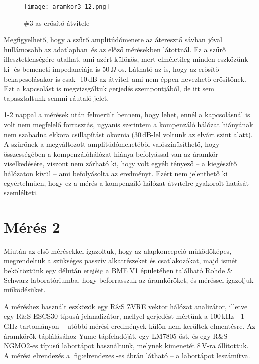 \begin{figure}[!ht]
	\centering
	\texttt{[image: aramkor3\_12.png]}
	\caption{\#3-as erősítő átvitele}
	\label{fig:erosito3}
\end{figure}

Megfigyelhető, hogy a szűrő amplitúdómenete az áteresztő sávban jóval hullámosabb az adatlapban\,\cite{SAW} és az előző mérésekben látottnál. Ez a szűrő illesztetlenségére utalhat, ami azért különös, mert elméletileg minden eszközünk ki- és bemeneti impedanciája is 50\,$\Omega$-os. Látható az is, hogy az erősítő bekapcsolásakor is csak -10\,dB az átvitel, ami nem éppen nevezhető erősítőnek. Ezt a kapcsolást is megvizsgáltuk gerjedés szempontjából, de itt sem tapasztaltunk semmi ráutaló jelet.

1-2 nappal a mérések után felmerült bennem, hogy lehet, ennél a kapcsolásnál is volt nem megfelelő forrasztás, ugyanis szerintem a kompenzáló hálózat hiányának nem szabadna ekkora csillapítást okoznia (30\,dB-lel voltunk az elvárt szint alatt). A szűrőnek a megváltozott amplitúdómenetéből valószínűsíthető, hogy összességében a kompenzálóhálózat hiánya befolyással van az áramkör viselkedésére, viszont nem zárható ki, hogy volt egyéb tényező -- a kiegészítő hálózaton kívül -- ami befolyásolta az eredményt. Ezért nem jelenthető ki egyértelműen, hogy ez a mérés a kompenzáló hálózat átvitelre gyakorolt hatását szemlélteti.


\section{Mérés 2}
\label{sec:meres2}

Miután az első mérésekkel igazoltuk, hogy az alapkoncepció működőképes, megrendeltük a szükséges passzív alkatrészeket és csatlakozókat\cite{90es_SMA}, majd ismét beköltöztünk egy délután erejéig a BME V1 épületében található Rohde \& Schwarz laboratóriumba, hogy beforrasszuk az áramköröket, és méréssel igazoljuk működésüket.

A méréshez használt eszközök egy R\&S ZVRE vektor hálózat analizátor, illetve egy R\&S ESCS30 típusú jelanalizátor, mellyel gerjedést mértünk a 100\,kHz - 1\,GHz tartományon -- utóbbi mérési eredmények külön nem kerültek elmentésre. Az áramkörök táplálásához Yume tápfeladóját, egy LM7805-öst, és egy R\&S NGMO2-es típusú labortápot használtunk, melynek kimenetét 8\,V-ra állítottuk. A mérési elrendezés a \ref{fig:elrendezes}-es ábrán látható -- a labortápot leszámítva.

